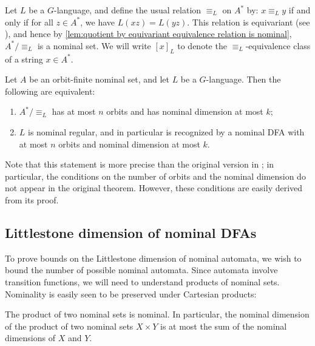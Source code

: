 \documentclass[runningheads]{llncs}
\newif\ifappendix
\begin{document}
Let $L$ be a $G$-language, and define the usual relation $\equiv_L$ on $A^*$ by: $x \equiv_L y$ if and only if for all $z \in A^*$, we have $L(xz) = L(yz)$. 
This relation is equivariant (see \cite[Lemma 3.4]{bojanczyk-klin-lasota:automata-theory-in-nominal-sets}), and hence by \autoref{lem:quotient by equivariant equivalence relation is nominal}, $A^* / \equiv_L$ is a nominal set.
We will write $[x]_L$ to denote the $\equiv_L$-equivalence class of a string $x \in A^*$.

\begin{theorem} \label{thm:nominal myhill-nerode}
    Let $A$ be an orbit-finite nominal set, and let $L$ be a $G$-language.
    Then the following are equivalent:
    \begin{enumerate}
        \item $A^* / \equiv_L$ has at most $n$ orbits and has nominal dimension at most $k$;
        \item $L$ is nominal regular, and in particular is recognized by a nominal DFA with at most $n$ orbits and nominal dimension at most $k$.
    \end{enumerate}
\end{theorem}

Note that this statement is more precise than the original version in \cite{bojanczyk-klin-lasota:automata-theory-in-nominal-sets}; in particular, the conditions on the number of orbits and the nominal dimension do not appear in the original theorem.
However, these conditions are easily derived from its proof. 
\ifappendix For completeness, a proof of the correspondence between the number of orbits and the nominal dimension is given in Appendix \ref{appendix:proof of nominal myhill-nerode}. \fi



\subsection{Littlestone dimension of nominal DFAs}

To prove bounds on the Littlestone dimension of nominal automata, we wish to bound the number of possible nominal automata. Since automata involve transition functions, we will need to understand products of nominal sets.
Nominality is easily seen to be preserved under Cartesian products:

\begin{proposition}\label{prop:dimension of product}
    The product of two nominal sets is nominal. 
    In particular, the nominal dimension of the product of two nominal sets $X \times Y$ is at most the sum of the nominal dimensions of $X$ and $Y$.
\end{proposition}
\end{document}
